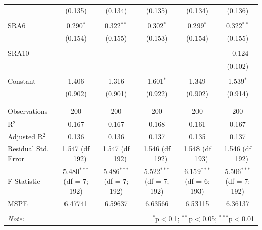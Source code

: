 \documentclass[12pt]{article}
\begin{document}
\begin{table}[!htbp]
\begin{adjustbox}{width=\textwidth}
\begin{tabular}{@{\extracolsep{5pt}}lccccc}
  & (0.135) & (0.134) & (0.135) & (0.134) & (0.136) \\ 
  & & & & & \\ 
 SRA6 & 0.290$^{*}$ & 0.322$^{**}$ & 0.302$^{*}$ & 0.299$^{*}$ & 0.322$^{**}$ \\ 
  & (0.154) & (0.155) & (0.153) & (0.154) & (0.155) \\ 
  & & & & & \\ 
 SRA10 &  &  &  &  & $-$0.124 \\ 
  &  &  &  &  & (0.102) \\ 
  & & & & & \\ 
 Constant & 1.406 & 1.316 & 1.601$^{*}$ & 1.349 & 1.539$^{*}$ \\ 
  & (0.902) & (0.901) & (0.922) & (0.902) & (0.914) \\ 
  & & & & & \\ 
\hline \\[-1.8ex] 
Observations & 200 & 200 & 200 & 200 & 200 \\ 
R$^{2}$ & 0.167 & 0.167 & 0.168 & 0.161 & 0.167 \\ 
Adjusted R$^{2}$ & 0.136 & 0.136 & 0.137 & 0.135 & 0.137 \\ 
Residual Std. Error & 1.547 (df = 192) & 1.547 (df = 192) & 1.546 (df = 192) & 1.548 (df = 193) & 1.546 (df = 192) \\ 
F Statistic & 5.480$^{***}$ (df = 7; 192) & 5.486$^{***}$ (df = 7; 192) & 5.522$^{***}$ (df = 7; 192) & 6.159$^{***}$ (df = 6; 193) & 5.506$^{***}$ (df = 7; 192) \\ 
MSPE & 6.47741 & 6.59637 & 6.63566 & 6.53115 & 6.36137 \\
\hline 
\hline \\[-1.8ex] 
\textit{Note:}  & \multicolumn{5}{r}{$^{*}$p$<$0.1; $^{**}$p$<$0.05; $^{***}$p$<$0.01} \\ 
\end{tabular} 
\end{adjustbox}
\end{table} 
\end{document}
